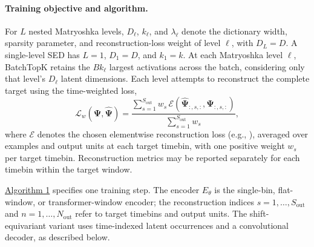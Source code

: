 \paragraph{Training objective and algorithm.}
For $L$ nested Matryoshka levels, $D_\ell$, $k_\ell$, and $\lambda_\ell$ denote the dictionary width, sparsity parameter, and reconstruction-loss weight of level $\ell$, with $D_L=D$. A single-level SED has $L=1$, $D_1=D$, and $k_1=k$. At each Matryoshka level $\ell$, BatchTopK retains the $Bk_\ell$ largest activations across the batch, considering only that level's $D_\ell$ latent dimensions. Each level attempts to reconstruct the complete target using the time-weighted loss,
\begin{equation}
\label{eq:time_weighted_reconstruction_loss}
    \mathcal{L}_{w}(\mathbf{\Psi},\hat{\mathbf{\Psi}})
    = \frac{\sum_{s=1}^{S_{\mathrm{out}}} w_s\,\mathcal{E}(\hat{\mathbf{\Psi}}_{:,s,:},\mathbf{\Psi}_{:,s,:})}
           {\sum_{s=1}^{S_{\mathrm{out}}} w_s},
\end{equation}
where \hyperref[paragraph:reconstruction_loss_functions]{$\mathcal{E}$} denotes the chosen elementwise reconstruction loss (e.g., ), averaged over examples and output units at each target timebin, with one positive weight $w_s$ per target timebin. Reconstruction metrics may be reported separately for each timebin within the target window.

\hyperref[algorithm:sed_model_training]{Algorithm 1} specifies one training step. The encoder $E_\theta$ is the single-bin, flat-window, or transformer-window encoder; the reconstruction indices $s=1,\ldots,S_{\mathrm{out}}$ and $n=1,\ldots,N_{\mathrm{out}}$ refer to target timebins and output units. The shift-equivariant variant uses time-indexed latent occurrences and a convolutional decoder, as described below.

